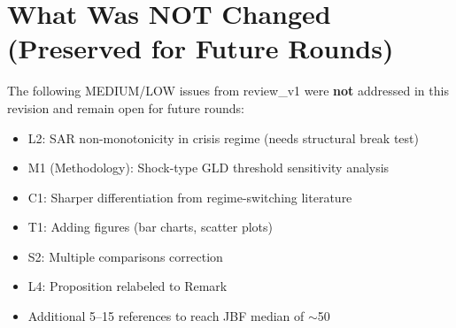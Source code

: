\documentclass[12pt,a4paper]{article}
\begin{document}
\section*{What Was NOT Changed (Preserved for Future Rounds)}

The following MEDIUM/LOW issues from review\_v1 were \textbf{not} addressed in this revision and remain open for future rounds:

\begin{itemize}[nosep]
\item L2: SAR non-monotonicity in crisis regime (needs structural break test)
\item M1 (Methodology): Shock-type GLD threshold sensitivity analysis
\item C1: Sharper differentiation from regime-switching literature
\item T1: Adding figures (bar charts, scatter plots)
\item S2: Multiple comparisons correction
\item L4: Proposition relabeled to Remark
\item Additional 5--15 references to reach JBF median of $\sim$50
\end{itemize}
\end{document}
